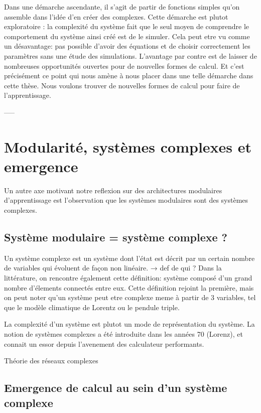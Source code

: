\documentclass[../main]{subfiles}
\begin{document}
Dans une démarche ascendante, il s’agit de partir de fonctions simples qu’on assemble dans l’idée d’en créer des complexes. Cette démarche est plutot exploratoire : la complexité du système fait que le seul moyen de comprendre le comportement du système ainsi créé est de le simuler. Cela peut etre vu comme un désavantage: pas possible d’avoir des équations et de choisir correctement les paramètres sans une étude des simulations. L’avantage par contre est de laisser de nombreuses opportunités ouvertes pour de nouvelles formes de calcul.
Et c’est précisément ce point qui nous amène à nous placer dans une telle démarche dans cette thèse. Nous voulons trouver de nouvelles formes de calcul pour faire de l’apprentissage. 

-----

\section*{ Modularité, systèmes complexes et emergence}

Un autre axe motivant notre reflexion sur des architectures modulaires d’apprentissage est l’observation que les systèmes modulaires sont des systèmes complexes. 

\subsection*{Système modulaire = système complexe ? }

Un système complexe est un système dont l'état est décrit par un certain nombre de variables qui évoluent de façon non linéaire. → def de qui ?
Dans la littérature, on rencontre également cette définition: système composé d'un grand nombre d'élements connectés entre eux. Cette définition rejoint la première, mais on peut noter qu'un système peut etre complexe meme à partir de 3 variables, tel que le modèle climatique de Lorentz ou le pendule triple.
 
La complexité d'un système est plutot un mode de représentation du système. La notion de systèmes complexes a été introduite dans les années 70 (Lorenz), et connait un essor depuis l'avenement des calculateur performants. 

Théorie des réseaux complexes

\subsection*{Emergence de calcul au sein d'un système complexe}
\end{document}
